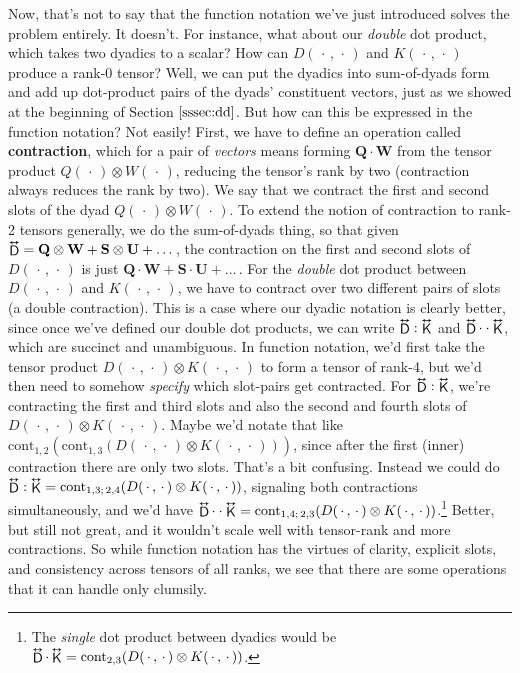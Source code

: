 \documentclass[12pt]{article}
\renewcommand{\vv}[1]{\mathbf{#1}}
\newcommand{\tightoverset}[2]{%
  \mathop{#2}\limits^{\vbox to -.5ex{\kern-0.75ex\hbox{$#1$}\vss}}}
\newcommand{\inlinedy}[1]{\tightoverset{\text{\tiny$\bm\leftrightarrow$}}{#1}}
\begin{document}
Now, that's not to say that the function notation we've just introduced solves the problem entirely. It doesn't. For instance, what about our \emph{double} dot product, which takes two dyadics to a scalar? How can $D(\, \cdot \, , \, \cdot \,)$ and $K(\, \cdot \, , \, \cdot \,)$ produce a rank-0 tensor? Well, we can put the dyadics into sum-of-dyads form and add up dot-product pairs of the dyads' constituent vectors, just as we showed at the beginning of Section $\ref{sssec:dd}$. But how can this be expressed in the function notation? Not easily! First, we have to define an operation called \textbf{contraction}, which for a pair of \emph{vectors} means forming $\vv Q \cdot \vv W$ from the tensor product $Q(\, \cdot \, ) \otimes W(\, \cdot \, )$, reducing the tensor's rank by two (contraction always reduces the rank by two). We say that we contract the first and second slots of the dyad $Q(\, \cdot \, ) \otimes W(\, \cdot \, )$. To extend the notion of contraction to rank-2 tensors generally, we do the sum-of-dyads thing, so that given $\inlinedy{\mathsf{D}} = \vv Q \otimes \vv W + \vv S \otimes \vv U + \ldots \,$, the contraction on the first and second slots of $D(\, \cdot \, , \, \cdot \,)$ is just $\vv Q \cdot \vv W + \vv S \cdot \vv U + \ldots \,$. For the \emph{double} dot product between $D(\, \cdot \, , \, \cdot \,)$ and $K(\, \cdot \, , \, \cdot \,)$, we have to contract over two different pairs of slots (a double contraction). This is a case where our dyadic notation is clearly better, since once we've defined our double dot products, we can write $\inlinedy{\mathsf{D}} : \inlinedy{\mathsf{K}}$ and $\inlinedy{\mathsf{D}} \cdot \cdot \inlinedy{\mathsf{K}}$, which are succinct and unambiguous. In function notation, we'd first take the tensor product $D(\, \cdot \, , \, \cdot \,) \otimes K(\, \cdot \, , \, \cdot \,)$ to form a tensor of rank-4, but we'd then need to somehow \emph{specify} which slot-pairs get contracted. For $\inlinedy{\mathsf{D}} : \inlinedy{\mathsf{K}}$, we're contracting the first and third slots and also the second and fourth slots of  $D(\, \cdot \, , \, \cdot \,) \otimes K(\, \cdot \, , \, \cdot \,)$. Maybe we'd notate that like ${\textrm{cont}_{1,2}(\textrm{cont}_{1,3}(D(\, \cdot \, , \, \cdot \,) \otimes K(\, \cdot \, , \, \cdot \,)))}$, since after the first (inner) contraction there are only two slots. That's a bit confusing. Instead we could do  ${\inlinedy{\mathsf{D}} : \inlinedy{\mathsf{K}} = \textrm{cont}_{1,3; \, 2,4}(D(\, \cdot \, , \, \cdot \,) \otimes K(\, \cdot \, , \, \cdot \,))}$, signaling both contractions simultaneously, and we'd have $\inlinedy{\mathsf{D}} \cdot \cdot \inlinedy{\mathsf{K}} = \textrm{cont}_{1,4; \, 2,3}(D(\, \cdot \, , \, \cdot \,) \otimes K(\, \cdot \, , \, \cdot \,))$.\footnote{The \emph{single} dot product between dyadics would be $\inlinedy{\mathsf{D}} \cdot \inlinedy{\mathsf{K}} = \textrm{cont}_{2,3}(D(\, \cdot \, , \, \cdot \,) \otimes K(\, \cdot \, , \, \cdot \,))$.} Better, but still not great, and it wouldn't scale well with tensor-rank and more contractions. So while function notation has the virtues of clarity, explicit slots, and consistency across tensors of all ranks, we see that there are some operations that it can handle only clumsily.
\end{document}

